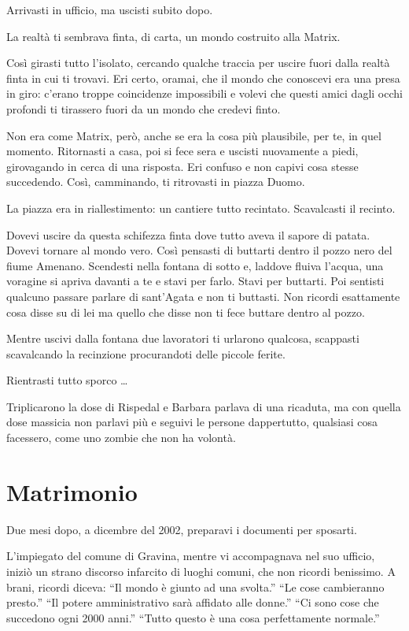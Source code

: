 Arrivasti in ufficio, ma uscisti subito dopo.

La realtà ti sembrava finta, di carta, un mondo costruito alla Matrix.

Così girasti tutto l'isolato, cercando qualche traccia per uscire fuori dalla realtà finta in cui ti trovavi. Eri certo, oramai, che il mondo che conoscevi era una presa in giro: c'erano troppe coincidenze impossibili e volevi che questi amici dagli occhi profondi ti tirassero fuori da un mondo che credevi finto.

Non era come Matrix, però, anche se era la cosa più plausibile, per te, in quel momento. Ritornasti a casa, poi si fece sera e uscisti nuovamente a piedi, girovagando in cerca di una risposta. Eri confuso e non capivi cosa stesse succedendo. Così, camminando, ti ritrovasti in piazza Duomo.

La piazza era in riallestimento: un cantiere tutto recintato. Scavalcasti il recinto.

Dovevi uscire da questa schifezza finta dove tutto aveva il sapore di patata. Dovevi tornare al mondo vero. Così pensasti di buttarti dentro il pozzo nero del fiume Amenano. Scendesti nella fontana di sotto e, laddove fluiva l'acqua, una voragine si apriva davanti a te e stavi per farlo. Stavi per buttarti. Poi sentisti qualcuno passare parlare di sant'Agata e non ti buttasti. Non ricordi esattamente cosa disse su di lei ma quello che disse non ti fece buttare dentro al pozzo.

Mentre uscivi dalla fontana due lavoratori ti urlarono qualcosa, scappasti scavalcando la recinzione procurandoti delle piccole ferite.

Rientrasti tutto sporco \ldots

Triplicarono la dose di Rispedal e Barbara parlava di una ricaduta, ma con quella dose massicia non parlavi più e seguivi le persone dappertutto, qualsiasi cosa facessero, come uno zombie che non ha volontà.

\section{Matrimonio}
\label{matrimonio}

Due mesi dopo, a dicembre del 2002, preparavi i documenti per sposarti.

L'impiegato del comune di Gravina, mentre vi accompagnava nel suo ufficio, iniziò un strano discorso infarcito di luoghi comuni, che non ricordi benissimo. A brani, ricordi diceva: “Il mondo è giunto ad una svolta.” “Le cose cambieranno presto.” “Il potere amministrativo sarà affidato alle donne.” “Ci sono cose che succedono ogni 2000 anni.” “Tutto questo è una cosa perfettamente normale.”

